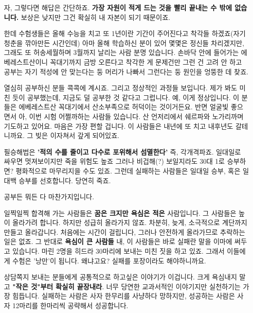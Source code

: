 자, 그렇다면 해답은 간단하죠.
\textbf{가장 자원이 적게 드는 것을 빨리 끝내는 수 밖에 없습니다.}
보상은 낮지만 그건 확실히 내 자본이 되기 때문이죠.
\vspace{5mm}

한데 수험생들은 올해 수능을 치고 또 1년이란 기간이 주어진다고 착각들 하겠죠(자기 청춘을 깎아만든 시간인데)
아마 올해 학습하신 분이 있어 몇몇은 정신들 차리겠지만, 그래도 또 허송세월하며 3월까지 날리는 사람 분명 있습니다.
손바닥 안에 들어가는 에베레스트산이니 꼭대기까지 금방 오른다고 착각한 게 문제건만
그런 건 고려 안 하고 공부는 자기 적성에 안 맞는다는 둥 머리가 나빠서 그런다는 둥 원인을 엉뚱한 데 찾죠.
\vspace{5mm}

열심히 공부하신 분들 콕콕에 계시죠. 그리고 정상적인 과정들 보입니다.
제가 봐도 미친 듯이 공부했는데, 지금도 덜 공부한 것 같다고 그럽니다. 예, 이게 정상입니다.
이 분들은 에베레스트산 꼭대기에서 산소부족으로 허덕이는 것이거든요.
반면 얼굴빛 좋으면서 아, 이번 시험 어쩔까하는 사람들 있습니다. 산 언저리에서 쉐르파와 노가리까며 기도하고 있어요.
마음은 가장 편할 겁니다. 이 사람들은 내년에 또 치고 내후년도 갈테니까요. 그 빚은 이자쳐서 갚게 되어있죠.
\vspace{5mm}

필승해법은
\textbf{'적의 수를 줄이고 다수로 포위해서 섬멸한다'}
즉, 각개격파죠.
일대일로 싸우면 멋져보이지만 죽을 위험도 높죠
그러나 비겁해(?) 보일지라도 30대 1로 승부하면? 평화적으로 마무리지을 수도 있죠.
그런데 실패하는 사람들은 일대일 승부, 혹은 일대백 승부를 선호합니다. 당연히 죽죠.
\vspace{5mm}

공부든 뭐든 다 마찬가지입니다.
\vspace{5mm}

일찍일찍 합격해 가는 사람들은 \textbf{꿈은 크지만 욕심은 적은} 사람입니다.
그 사람들은 높이 올라가려 합니다. 하지만 성급히 올라가지 않죠. 차분히, 늦게, 소극적으로 계단까지 만들고 올라갑니다.
처음에는 시간이 걸립니다, 그러나 안전하게 올라가므로 추락하는 일은 없죠.
그 반대로 \textbf{욕심이 큰 사람들}
내, 이 사람들은 바로 실패란 말을 이마에 써두고 있습니다.
마린 2명을 히드라 30마리에 보내는 미친 짓을 하고 있죠.
그래서 이들에게 수험은 '낭만'이 됩니다. 왜냐고요? 실패를 포장이라도 해야하니까요.
\vspace{5mm}

상담쪽지 보내는 분들에게 공통적으로 하고싶은 이야기가 이겁니다.
크게 욕심내지 말고 \textbf{"작은 것"부터 확실히 끝장내라}.
너무 당연한 교과서적인 이야기지만 실천하기는 가장 힘듭니다.
실패하는 사람은 사자 한무리를 사냥하다 망하지만, 성공하는 사람은 사자 12마리를 한마리씩 공략해서 성공합니다.
\vspace{5mm}







